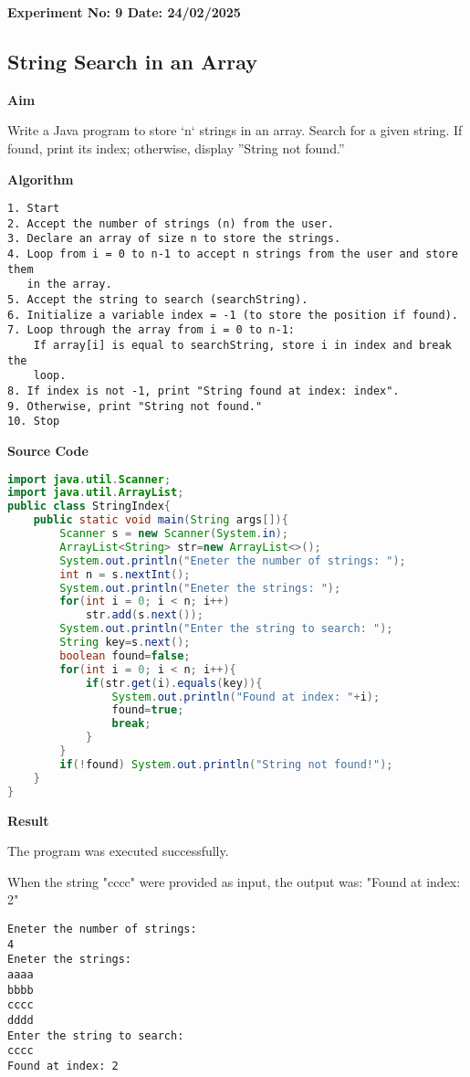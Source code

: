 \textbf{Experiment No: 9 \hfill Date: 24/02/2025}

\begin{center}
    \Large \subsection*{String Search in an Array}
\end{center}

\textbf{Aim}
\vspace{0.5cm}

Write a Java program to store ‘n‘ strings in an array. Search for a given string. If found, print its index; otherwise, display ”String not found.”

\vspace{0.5cm}
\textbf{Algorithm}
\vspace{0.5cm}
\begin{verbatim}
1. Start
2. Accept the number of strings (n) from the user.
3. Declare an array of size n to store the strings.
4. Loop from i = 0 to n-1 to accept n strings from the user and store them 
   in the array.
5. Accept the string to search (searchString).
6. Initialize a variable index = -1 (to store the position if found).
7. Loop through the array from i = 0 to n-1:
    If array[i] is equal to searchString, store i in index and break the 
    loop.
8. If index is not -1, print "String found at index: index".
9. Otherwise, print "String not found."
10. Stop
\end{verbatim}

\vspace{0.5cm}
\textbf{Source Code}
\begin{lstlisting}[language=Java]
import java.util.Scanner;
import java.util.ArrayList;
public class StringIndex{
	public static void main(String args[]){
		Scanner s = new Scanner(System.in);
		ArrayList<String> str=new ArrayList<>();
		System.out.println("Eneter the number of strings: ");
		int n = s.nextInt();
		System.out.println("Eneter the strings: ");
		for(int i = 0; i < n; i++)
			str.add(s.next());
		System.out.println("Enter the string to search: ");
		String key=s.next();
		boolean found=false;
		for(int i = 0; i < n; i++){
			if(str.get(i).equals(key)){
				System.out.println("Found at index: "+i);
				found=true;
				break;
			}
		}
		if(!found) System.out.println("String not found!");
	}
}
\end{lstlisting}

\vspace{0.5cm}
\textbf{Result}
\vspace{0.5cm}

The program was executed successfully. 

When the string "cccc" were provided as input, the output was: "Found at index: 2"
\begin{verbatim}
Eneter the number of strings: 
4
Eneter the strings: 
aaaa
bbbb
cccc
dddd
Enter the string to search: 
cccc
Found at index: 2
\end{verbatim}

